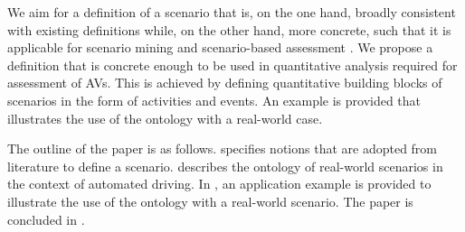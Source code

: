We aim for a definition of a scenario that is, on the one hand, broadly consistent with existing definitions \cite{geyer2014, ulbrich2015, elrofai2016scenario} while, on the other hand, more concrete, such that it is applicable for scenario mining \cite{elrofai2016scenario} and scenario-based assessment \cite{stellet2015taxonomy, deGelder2017assessment}. We propose a definition that is concrete enough to be used in quantitative analysis required for assessment of AVs. This is achieved by defining quantitative building blocks of scenarios in the form of activities and events. An example is provided that illustrates the use of the ontology with a real-world case.

The outline of the paper is as follows. 
 specifies notions that are adopted from literature to define a scenario.  describes the ontology of real-world scenarios in the context of automated driving. 
In , an application example is provided to illustrate the use of the ontology with a real-world scenario. 
The paper is concluded in .
